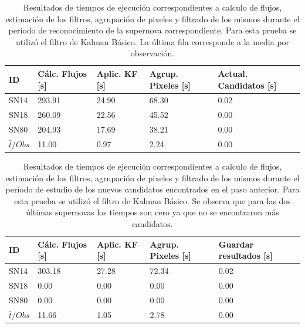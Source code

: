 \begin{table}[h!]
\centering
\caption{Resultados de tiempos de ejecuci\'on correspondientes a calculo de flujos, estimaci\'on de los filtros, agrupaci\'on de pixeles y filtrado de los mismos durante el per\'iodo de reconocimiento de la supernova correspondiente. Para esta prueba se utiliz\'o el filtro de Kalman B\'asico. La \'ultima fila corresponde a la media por observaci\'on.}
\begin{tabular}{|l|l|l|l|l|}
\hline
\textbf{ID} & \textbf{C\'alc. Flujos [s]} & \textbf{Aplic. KF [s]} &  \textbf{Agrup. Pixeles [s]}  & \textbf{Actual. Candidatos [s]}\\ \hline \hline
SN14        & 293.91            & 24.90        &  68.30 & 0.02 \\ \hline
SN18            & 260.09             & 22.56         &  45.52  & 0.00\\ \hline
SN80            & 204.93             & 17.69         &   38.21 & 0.00 \\ \hline \hline
$\bar{t}/Obs$ & 11.00 &  0.97 & 2.24 & 0.00\\\hline 
\end{tabular}
\label{tab:t1}
\end{table}

\begin{table}[h!]
\centering
\caption{Resultados de tiempos de ejecuci\'on correspondientes a calculo de flujos, estimaci\'on de los filtros, agrupaci\'on de pixeles y filtrado de los mismos durante el per\'iodo de estudio de los nuevos candidatos encontrados en el paso anterior. Para esta prueba se utiliz\'o el filtro de Kalman B\'asico. Se observa que para las dos \'ultimas supernovas los tiempos son cero ya que no se encontraron m\'as candidatos.}
\begin{tabular}{|l|l|l|l|l|}
\hline
\textbf{ID} & \textbf{C\'alc. Flujos [s]} & \textbf{Aplic. KF [s]} &  \textbf{Agrup. Pixeles [s]}  & \textbf{Guardar resultados [s]}\\ \hline \hline
SN14        & 303.18            & 27.28        &  72.34 & 0.02 \\ \hline
SN18            & 0.00             & 0.00         &  0.00  & 0.00\\ \hline
SN80            & 0.00             & 0.00         &   0.00 & 0.00 \\ \hline\hline 
$\bar{t}/Obs$ & 11.66 &  1.05 & 2.78 & 0.00\\\hline 
\end{tabular}
\label{tab:t2}
\end{table}

